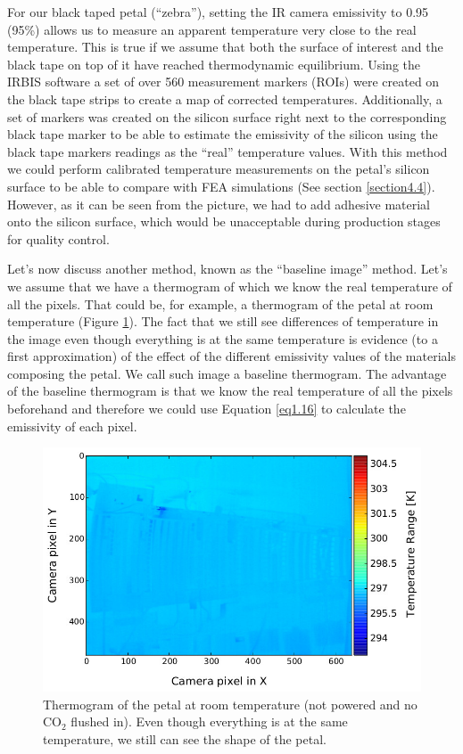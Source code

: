 		For our black taped petal (“zebra”), setting the IR camera emissivity to 0.95 (95\%) allows us to measure an apparent temperature very close to the real temperature. This is true if we assume that both the surface of interest and the black tape on top of it have reached thermodynamic equilibrium. Using the IRBIS software a set of over 560 measurement markers (ROIs) were created on the black tape strips to create a map of corrected temperatures. Additionally, a set of markers was created on the silicon surface right next to the corresponding black tape marker to be able to estimate the emissivity of the silicon using the black tape markers readings as the “real” temperature values. With this method we could perform calibrated temperature measurements on the petal’s silicon surface to be able to compare with FEA simulations (See section \ref{section4.4}). However, as it can be seen from the picture, we had to add adhesive material onto the silicon surface, which would be unacceptable during production stages for quality control. 
		
		Let’s now discuss another method, known as the “baseline image” method. Let's we assume that we have a thermogram of which we know the real temperature of all the pixels. That could be, for example, a thermogram of the petal at room temperature (Figure \ref{fig4.2}). The fact that we still see differences of temperature in the image even though everything is at the same temperature is evidence (to a first approximation) of the effect of the different emissivity values of the materials composing the petal. We call such image a baseline thermogram. The advantage of the baseline thermogram is that we know the real temperature of all the pixels beforehand and therefore we could use Equation \ref{eq1.16} to calculate the emissivity of each pixel. 
		
		\begin{figure}[ht!]
			\centering
			\captionsetup{justification=centering,margin=2cm}
			\includegraphics[scale=0.55]{Figures/Chapter04/thermo_Temp_201708091701_avg.jpg}
			\caption{Thermogram of the petal at room temperature (not powered and no CO$_{2}$ flushed in). Even though everything is at the same temperature, we still can see the shape of the petal.}\label{fig4.2}
		\end{figure}
		
